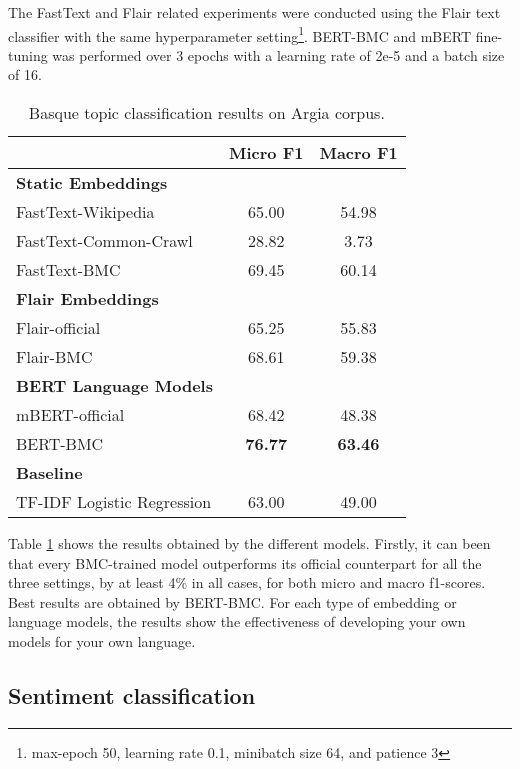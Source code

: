 \documentclass[10pt, a4paper]{article}
\begin{document}
The FastText and Flair related experiments were conducted using the Flair text classifier with the same hyperparameter setting\footnote{max-epoch 50, learning rate 0.1, minibatch size 64, and  patience 3 }. BERT-BMC and mBERT fine-tuning was performed over 3 epochs with a learning rate of 2e-5 and a batch size of 16.

\begin{table}[!ht]\small
\centering
\begin{tabular}{@{\hspace{0.3cm}}lcc} \hline
 {\textbf{}} & {\textbf{Micro F1}} &  {\textbf{Macro F1}} \\ \hline
\textbf{Static Embeddings} & & \\
FastText-Wikipedia & 65.00 & 54.98 \\
FastText-Common-Crawl & 28.82 & 3.73  \\
FastText-BMC  & 69.45 & 60.14 \\
\hline%
\textbf{Flair Embeddings}\\
Flair-official & 65.25 & 55.83 \\
Flair-BMC  & 68.61 & 59.38  \\ \hline
\textbf{BERT Language Models}\\
mBERT-official  & 68.42 & 48.38  \\
BERT-BMC  & \textbf{76.77}	& \textbf{63.46}  \\
\hline
\textbf{Baseline} \\
TF-IDF Logistic Regression & 63.00 & 49.00 \\
\hline
\end{tabular}
\caption{Basque topic classification results on Argia corpus.}\label{tab:topic}
\end{table}

Table \ref{tab:topic} shows the results obtained by the different models. Firstly, it can been that every BMC-trained model outperforms its official counterpart for all the three settings, by at least 4\% in all cases, for both micro and macro f1-scores. Best results are obtained by BERT-BMC. For each type of embedding or language models, the results show the effectiveness of developing your own models for your own language.

\subsection{Sentiment classification}\label{sec:polarity}
\end{document}
